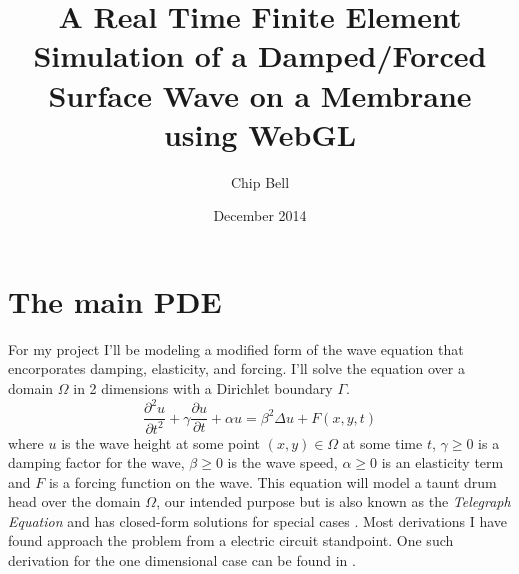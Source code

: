 \documentclass[a4paper,12pt]{article}
\begin{document}
\newcommand{\innerproduct}[2]{\int\limits_{\Omega} #1 #2 d\Omega}
\newcommand{\innerproductdot}[2]{\int\limits_{\Omega} \nabla #1 \cdot \nabla #2 d\Omega}
\newcommand{\firstderivative}[2]{\frac{d #1}{d #2}}
\newcommand{\secondderivative}[2]{\frac{d^2 #1}{d #2^2}}
\newcommand{\firstpartial}[2]{\frac{\partial #1}{\partial #2}}
\newcommand{\secondpartial}[2]{\frac{\partial^2 #1}{\partial #2^2}}
\newcommand{\laplacian}[1]{\Delta #1}
\newcommand{\secondfinitediff}[1]{\frac{#1^{n+1} - 2#1^n + #1^{n-1}}{\delta t^2}}
\newcommand{\firstfinitediff}[1]{\frac{#1^{n+1} - #1^{n-1}}{2\delta t}}
\newcommand{\step}[1]{\left( \frac{1}{\delta t^2} #1 \frac{\gamma}{2\delta t} \right)}
\newcommand{\mat}[2][rrrrrr]{
    \left(\begin{array}{#1}
    #2 \\
    \end{array}
    \right)
}

\title{A Real Time Finite Element Simulation of a Damped/Forced Surface Wave on a Membrane using WebGL}
\author{Chip Bell}
\date{December 2014}
\maketitle



\section{The main PDE}
For my project I'll be modeling a modified form of the wave equation that encorporates damping, elasticity, and
forcing. I'll solve the equation over a domain $\Omega$ in 2 dimensions with a Dirichlet boundary $\Gamma$. 
\begin{equation} \label{eq:main_pde}
\secondpartial{u}{t} + \gamma \firstpartial{u}{t} + \alpha u
=
\beta^2 \laplacian{u} + F(x,y,t)
\end{equation}
where $u$ is the wave height at some point $(x,y) \in \Omega$ at some time $t$, $\gamma \ge 0$ is a damping factor for the wave,
$\beta \ge 0$ is the wave speed, $\alpha \ge 0$ is an elasticity term and $F$ is a forcing function on the wave. This equation
will model a taunt drum head over the domain $\Omega$, our intended purpose but is also known as the
\emph{Telegraph Equation} and has closed-form solutions for special cases \cite{pde_solution}. Most derivations I have found
approach
the problem from a electric circuit standpoint. One such derivation for the one dimensional case can be found in
\cite{pde_derivation}.








\end{document}
